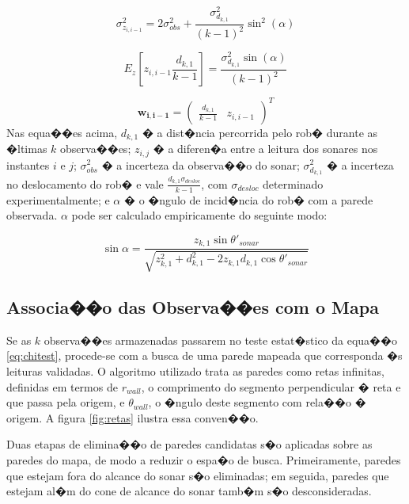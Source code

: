 \begin{equation}
\sigma^2_{z_{i,i-1}}=2\sigma^2_{obs} + \frac{\sigma^2_{d_{k,1}}}{(k-1)^2} \sin^2(\alpha)
\end{equation}

\begin{equation}
 E_z\left[ z_{i, i-1} \frac{d_{k,1}}{k-1} \right] = \frac{\sigma^2_{d_{k,1}} \sin(\alpha)}{(k-1)^2}
\end{equation}

\begin{equation}
\bm{w_{i,i-1}}=
\begin{pmatrix}
\frac{d_{k,1}}{k-1} & z_{i,i-1}
\end{pmatrix}^T
\end{equation}
Nas equa��es acima, $d_{k,1}$ � a dist�ncia percorrida pelo rob� durante as �ltimas $k$ observa��es; $z_{i,j}$ � a diferen�a entre a leitura dos sonares nos instantes $i$ e $j$; $\sigma^2_{obs}$ � a incerteza da observa��o do sonar; $\sigma^2_{d_{k,1}}$ � a incerteza no deslocamento do rob� e vale $\frac{d_{k,1}\sigma_{desloc}}{k-1}$, com $\sigma_{desloc}$ determinado experimentalmente; e $\alpha$ � o �ngulo de incid�ncia do rob� com a parede observada. $\alpha$ pode ser calculado empiricamente do seguinte modo:

\begin{equation}
\sin \alpha=\frac{z_{k,1}\sin \theta'_{sonar}}{\sqrt{z_{k,1}^2 + d_{k,1}^2 - 2z_{k,1} d_{k,1} \cos \theta'_{sonar}}}
\label{eq:novoalpha}
\end{equation}

\subsection{Associa��o das Observa��es com o Mapa}\label{sec:associacao}
Se as $k$ observa��es armazenadas passarem no teste estat�stico da equa��o \ref{eq:chitest}, procede-se com a busca de uma parede mapeada que corresponda �s leituras validadas. O algoritmo utilizado trata as paredes como retas infinitas, definidas em termos de $r_{wall}$, o comprimento do segmento perpendicular � reta e que passa pela origem, e $\theta_{wall}$, o �ngulo deste segmento com rela��o � origem. A figura \ref{fig:retas} ilustra essa conven��o.

Duas etapas de elimina��o de paredes candidatas s�o aplicadas sobre as paredes do mapa, de modo a reduzir o espa�o de busca. Primeiramente, paredes que estejam fora do alcance do sonar s�o eliminadas; em seguida, paredes que estejam al�m do cone de alcance do sonar tamb�m s�o desconsideradas.

